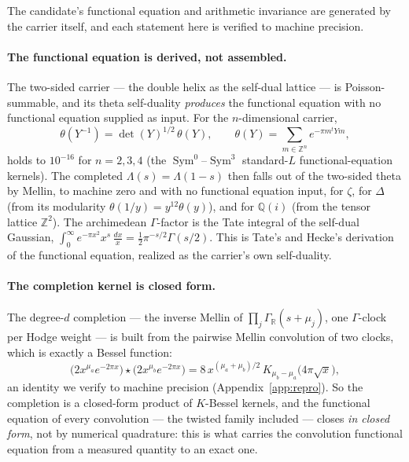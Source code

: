 \documentclass[11pt]{article}
\theoremstyle{definition}
\newcommand{\Sym}{\operatorname{Sym}}
\begin{document}
The candidate's functional equation and arithmetic invariance are generated by the carrier itself, and
each statement here is verified to machine precision.

\paragraph{The functional equation is derived, not assembled.} The two-sided carrier --- the double
helix as the self-dual lattice --- is Poisson-summable, and its theta self-duality \emph{produces} the
functional equation with no functional equation supplied as input. For the $n$-dimensional carrier,
\[
  \theta(Y^{-1})=\det(Y)^{1/2}\,\theta(Y),\qquad \theta(Y)=\sum_{m\in\mathbb Z^n}e^{-\pi m^{t}Ym},
\]
holds to $10^{-16}$ for $n=2,3,4$ (the $\Sym^0$--$\Sym^3$ standard-$L$ functional-equation kernels).
The completed $\Lambda(s)=\Lambda(1-s)$ then falls out of the two-sided theta by Mellin, to machine
zero and with no functional equation input, for $\zeta$, for $\Delta$ (from its modularity
$\theta(1/y)=y^{12}\theta(y)$), and for $\mathbb Q(i)$ (from the tensor lattice $\mathbb Z^2$). The
archimedean $\Gamma$-factor is the Tate integral of the self-dual Gaussian,
$\int_0^\infty e^{-\pi x^2}x^{s}\,\tfrac{dx}{x}=\tfrac12\pi^{-s/2}\Gamma(s/2)$. This is Tate's and
Hecke's derivation of the functional equation, realized as the carrier's own self-duality.

\paragraph{The completion kernel is closed form.} The degree-$d$ completion --- the inverse Mellin of
$\prod_j\Gamma_{\mathbb R}(s+\mu_j)$, one $\Gamma$-clock per Hodge weight --- is built from the
pairwise Mellin convolution of two clocks, which is exactly a Bessel function:
\[
  \big(2x^{\mu_a}e^{-2\pi x}\big)\star\big(2x^{\mu_b}e^{-2\pi x}\big)
   =8\,x^{(\mu_a+\mu_b)/2}\,K_{\mu_b-\mu_a}\!\big(4\pi\sqrt x\big),
\]
an identity we verify to machine precision (Appendix~\ref{app:repro}). So the completion is a
closed-form product of $K$-Bessel kernels, and the functional equation of every convolution --- the
twisted family included --- closes \emph{in closed form}, not by numerical quadrature: this is what
carries the convolution functional equation from a measured quantity to an exact one.
\end{document}
